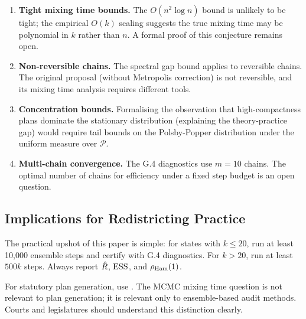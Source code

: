 \begin{enumerate}
\item \textbf{Tight mixing time bounds.}
      The $O(n^2 \log n)$ bound is unlikely to be tight; the empirical
      $O(k)$ scaling suggests the true mixing time may be polynomial in
      $k$ rather than $n$.
      A formal proof of this conjecture remains open.

\item \textbf{Non-reversible chains.}
      The spectral gap bound applies to reversible chains.
      The original \recom{} proposal (without Metropolis correction) is
      not reversible, and its mixing time analysis requires different tools.

\item \textbf{Concentration bounds.}
      Formalising the observation that high-compactness plans dominate
      the stationary distribution (explaining the theory-practice gap)
      would require tail bounds on the Polsby-Popper distribution under
      the uniform measure over $\mathcal{P}$.

\item \textbf{Multi-chain convergence.}
      The G.4 diagnostics use $m = 10$ chains.
      The optimal number of chains for efficiency under a fixed step
      budget is an open question.
\end{enumerate}

\subsection{Implications for Redistricting Practice}

The practical upshot of this paper is simple: for states with $k \leq 20$,
run at least 10{,}000 ensemble steps and certify with G.4 diagnostics.
For $k > 20$, run at least $500k$ steps.
Always report $\hat{R}$, $\mathrm{ESS}$, and $\rho_{\mathrm{Ham}}(1)$.

For statutory plan generation, use \cs{}.
The MCMC mixing time question is not relevant to plan generation; it
is relevant only to ensemble-based audit methods.
Courts and legislatures should understand this distinction clearly.

